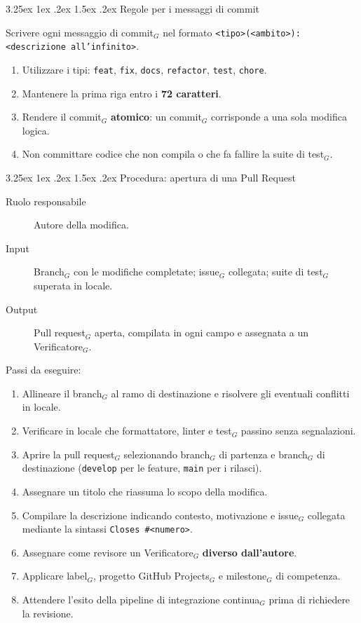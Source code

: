 \documentclass[a4paper, 10pt]{article}
\makeatletter
\renewcommand\paragraph{\@startsection{paragraph}{4}{\z@}%
  {3.25ex \@plus1ex \@minus .2ex}%
  {1.5ex \@plus .2ex}%
  {\normalfont\normalsize\bfseries}}
\makeatother
\begin{document}
\paragraph{Regole per i messaggi di commit}

Scrivere ogni messaggio di commit$_G$ nel formato \texttt{<tipo>(<ambito>): <descrizione all'infinito>}.

\begin{enumerate}
    \item Utilizzare i tipi: \texttt{feat}, \texttt{fix}, \texttt{docs}, \texttt{refactor}, \texttt{test}, \texttt{chore}.
    \item Mantenere la prima riga entro i \textbf{72 caratteri}.
    \item Rendere il commit$_G$ \textbf{atomico}: un commit$_G$ corrisponde a una sola modifica logica.
    \item Non committare codice che non compila o che fa fallire la suite di test$_G$.
\end{enumerate}

\paragraph{Procedura: apertura di una Pull Request}

\begin{description}
    \item[Ruolo responsabile] Autore della modifica.
    \item[Input] Branch$_G$ con le modifiche completate; issue$_G$ collegata; suite di test$_G$ superata in locale.
    \item[Output] Pull request$_G$ aperta, compilata in ogni campo e assegnata a un Verificatore$_G$.
\end{description}

\noindent Passi da eseguire:
\begin{enumerate}
    \item Allineare il branch$_G$ al ramo di destinazione e risolvere gli eventuali conflitti in locale.
    \item Verificare in locale che formattatore, linter e test$_G$ passino senza segnalazioni.
    \item Aprire la pull request$_G$ selezionando branch$_G$ di partenza e branch$_G$ di destinazione (\texttt{develop} per le feature, \texttt{main} per i rilasci).
    \item Assegnare un titolo che riassuma lo scopo della modifica.
    \item Compilare la descrizione indicando contesto, motivazione e issue$_G$ collegata mediante la sintassi \texttt{Closes \#<numero>}.
    \item Assegnare come revisore un Verificatore$_G$ \textbf{diverso dall'autore}.
    \item Applicare label$_G$, progetto GitHub Projects$_G$ e milestone$_G$ di competenza.
    \item Attendere l'esito della pipeline di integrazione continua$_G$ prima di richiedere la revisione.
\end{enumerate}
\end{document}

